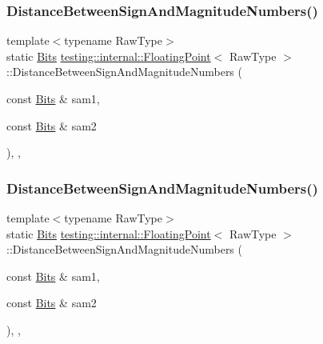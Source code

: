 \subsubsection{\texorpdfstring{DistanceBetweenSignAndMagnitudeNumbers()}{DistanceBetweenSignAndMagnitudeNumbers()}\hspace{0.1cm}{\footnotesize\ttfamily [2/3]}}
{\footnotesize\ttfamily template$<$typename Raw\+Type$>$ \\
static \mbox{\hyperlink{classtesting_1_1internal_1_1_floating_point_abf228bf6cd48f12c8b44c85b4971a731}{Bits}} \mbox{\hyperlink{classtesting_1_1internal_1_1_floating_point}{testing\+::internal\+::\+Floating\+Point}}$<$ Raw\+Type $>$\+::Distance\+Between\+Sign\+And\+Magnitude\+Numbers (\begin{DoxyParamCaption}\item[{const \mbox{\hyperlink{classtesting_1_1internal_1_1_floating_point_abf228bf6cd48f12c8b44c85b4971a731}{Bits}} \&}]{sam1,  }\item[{const \mbox{\hyperlink{classtesting_1_1internal_1_1_floating_point_abf228bf6cd48f12c8b44c85b4971a731}{Bits}} \&}]{sam2 }\end{DoxyParamCaption})\hspace{0.3cm}{\ttfamily [inline]}, {\ttfamily [static]}, {\ttfamily [private]}}

\mbox{\label{classtesting_1_1internal_1_1_floating_point_afe00f9f26ad2929a061f7e07b8a5071a}} 
\subsubsection{\texorpdfstring{DistanceBetweenSignAndMagnitudeNumbers()}{DistanceBetweenSignAndMagnitudeNumbers()}\hspace{0.1cm}{\footnotesize\ttfamily [3/3]}}
{\footnotesize\ttfamily template$<$typename Raw\+Type$>$ \\
static \mbox{\hyperlink{classtesting_1_1internal_1_1_floating_point_abf228bf6cd48f12c8b44c85b4971a731}{Bits}} \mbox{\hyperlink{classtesting_1_1internal_1_1_floating_point}{testing\+::internal\+::\+Floating\+Point}}$<$ Raw\+Type $>$\+::Distance\+Between\+Sign\+And\+Magnitude\+Numbers (\begin{DoxyParamCaption}\item[{const \mbox{\hyperlink{classtesting_1_1internal_1_1_floating_point_abf228bf6cd48f12c8b44c85b4971a731}{Bits}} \&}]{sam1,  }\item[{const \mbox{\hyperlink{classtesting_1_1internal_1_1_floating_point_abf228bf6cd48f12c8b44c85b4971a731}{Bits}} \&}]{sam2 }\end{DoxyParamCaption})\hspace{0.3cm}{\ttfamily [inline]}, {\ttfamily [static]}, {\ttfamily [private]}}

